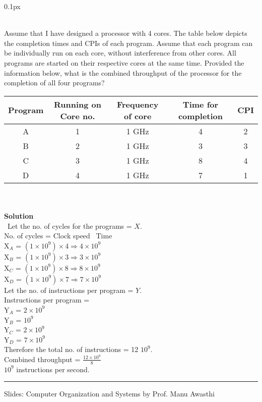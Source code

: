 \documentclass[11pt]{article}
\newcommand{\problem}[1]{\begin{adjustwidth}{0.1px}\noindent \framebox[1.2\width]{\large Problem #1}\end{adjustwidth} \bigskip\\}
\begin{document}
\newpage
\problem{9}
Assume that I have designed a processor with 4 cores. The table below depicts the completion times and CPIs of each program. Assume that each program can be individually run on each core, without interference from other cores. All programs are started on their respective cores at the same time. Provided the information below, what is the combined throughput of the processor for the completion of all four programs? \\
\begin{center}
\begin{tabular}{ |c|c|c|c|c| } 
\hline
Program & Running on Core no. & Frequency of core & Time for completion & CPI\\
\hline
A & 1 & 1 GHz & 4 & 2 \\ 
B & 2 & 1 GHz & 3 & 3 \\ 
C & 3 & 1 GHz & 8 & 4 \\ 
D & 4 & 1 GHz & 7 & 1 \\ 
\hline
\end{tabular}
\end{center}
\\
\bigskip \\
\textbf{Solution}\\\
Let the no. of cycles for the programs = $X$.
\bigskip
\\
No. of cycles = Clock speed \times \ Time\\
X$_A$ = $(1 \times 10^9) \times 4 \Rightarrow 4 \times 10^9$\\
X$_B$ = $(1 \times 10^9) \times 3 \Rightarrow 3 \times 10^9$\\
X$_C$ = $(1 \times 10^9) \times 8 \Rightarrow 8 \times 10^9$\\
X$_D$ = $(1 \times 10^9) \times 7 \Rightarrow 7 \times 10^9$\bigskip
\\
Let the no. of instructions per program = $Y$.\\
Instructions per program = \\
Y$_A$ = $2 \times 10^9$\\
Y$_B$ = $10^9$\\
Y$_C$ = $2 \times 10^9$\\
Y$_D$ = $7 \times 10^9$\bigskip
\\
Therefore the total no. of instructions = 12 \times $10^9$.\\
Combined throughput = $\frac{12 \times 10^9}{8}$\\
 \times $10^9$ instructions per second.



\par\noindent\rule{\textwidth}{0.4pt}


Slides: Computer Organization and Systems by Prof. Manu Awasthi \\
\end{document}
